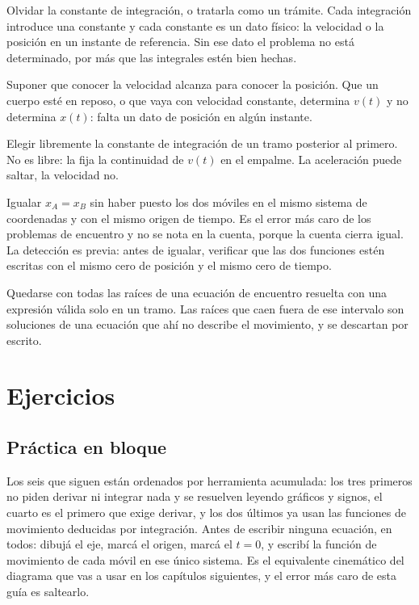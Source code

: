 \documentclass[11pt,openany]{book}
\begin{document}
\begin{erroresComunes}
  \item Olvidar la constante de integración, o tratarla como un trámite. Cada integración introduce una constante y cada constante es un dato físico: la velocidad o la posición en un instante de referencia. Sin ese dato el problema no está determinado, por más que las integrales estén bien hechas.
  \item Suponer que conocer la velocidad alcanza para conocer la posición. Que un cuerpo esté en reposo, o que vaya con velocidad constante, determina $v(t)$ y no determina $x(t)$: falta un dato de posición en algún instante.
  \item Elegir libremente la constante de integración de un tramo posterior al primero. No es libre: la fija la continuidad de $v(t)$ en el empalme. La aceleración puede saltar, la velocidad no.
  \item Igualar $x_A = x_B$ sin haber puesto los dos móviles en el mismo sistema de coordenadas y con el mismo origen de tiempo. Es el error más caro de los problemas de encuentro y no se nota en la cuenta, porque la cuenta cierra igual. La detección es previa: antes de igualar, verificar que las dos funciones estén escritas con el mismo cero de posición y el mismo cero de tiempo.
  \item Quedarse con todas las raíces de una ecuación de encuentro resuelta con una expresión válida solo en un tramo. Las raíces que caen fuera de ese intervalo son soluciones de una ecuación que ahí no describe el movimiento, y se descartan por escrito.
\end{erroresComunes}

\section{Ejercicios}

\subsection{Práctica en bloque}

Los seis que siguen están ordenados por herramienta acumulada: los tres primeros no piden derivar ni integrar nada y se resuelven leyendo gráficos y signos, el cuarto es el primero que exige derivar, y los dos últimos ya usan las funciones de movimiento deducidas por integración. Antes de escribir ninguna ecuación, en todos: dibujá el eje, marcá el origen, marcá el $t=0$, y escribí la función de movimiento de cada móvil en ese único sistema. Es el equivalente cinemático del diagrama que vas a usar en los capítulos siguientes, y el error más caro de esta guía es saltearlo.
\end{document}
